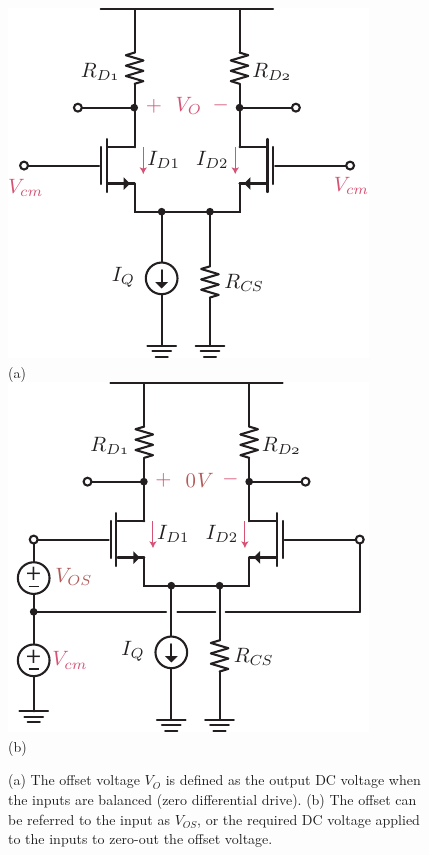 \begin{figure}[H]
\centering
\includegraphics[scale=1.35]{Diffamp_offset}\\
(a)\\[0.5cm]
\includegraphics[scale=1.35]{Diffamp_offset_input}\\
(b)\\
\caption{(a) The offset voltage $V_O$ is defined as the output DC voltage when the inputs are balanced (zero differential drive).  (b) The offset can be referred to the input as $V_{OS}$, or the required DC voltage applied to the inputs to zero-out the offset voltage.}
\label{fig:Diffamp_offset}
\end{figure}
\newpage
